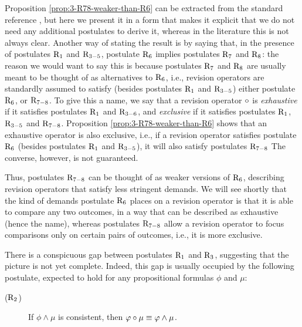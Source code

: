 Proposition \ref{prop:3-R78-weaker-than-R6} can be extracted 
from the standard reference \cite{KatsunoM92}, 
but here we present it in a form that makes it explicit 
that we do not need any additional postulates to derive it, 
whereas in the literature this is not always clear.
Another way of stating the result is by saying that, 
in the presence of postulates $\mathrm{R}_{1}$ and $\mathrm{R}_{3-5}$, postulate
$\mathrm{R}_{6}$ implies postulates $\mathrm{R}_{7}$ and $\mathrm{R}_{8}$: 
the reason we would want to say this is because 
postulates $\mathrm{R}_{7}$ and $\mathrm{R}_{8}$ are usually 
meant to be thought of as alternatives to $\mathrm{R}_{6}$,
i.e., revision operators are standardly assumed to 
satisfy (besides postulates $\mathrm{R}_{1}$ and $\mathrm{R}_{3-5}$) either postulate $\mathrm{R}_{6}$, 
or $\mathrm{R}_{7-8}$.
To give this a name, we say that 
a revision operator $\circ$ is \emph{exhaustive} if it satisfies postulates $\mathrm{R}_{1}$ and $\mathrm{R}_{3-6}$,
and \emph{exclusive} if it satisfies postulates $\mathrm{R}_{1}$, $\mathrm{R}_{3-5}$ and $\mathrm{R}_{7-8}$.
Proposition \ref{prop:3-R78-weaker-than-R6} shows that 
an exhaustive operator is also exclusive,
i.e., if a revision operator satisfies postulate $\mathrm{R}_{6}$ 
(besides postulates $\mathrm{R}_{1}$ and $\mathrm{R}_{3-5}$),
it will also satisfy postulates $\mathrm{R}_{7-8}$
The converse, however, is not guaranteed. 

Thus, postulates $\mathrm{R}_{7-8}$ can be thought of as weaker versions of $\mathrm{R}_{6}$,
describing revision operators that satisfy less stringent demands.
We will see shortly that the kind of demands postulate $\mathrm{R}_{6}$ places 
on a revision operator is that it is able 
to compare any two outcomes, in a way that can be described as exhaustive (hence the name),
whereas postulates $\mathrm{R}_{7-8}$ allow a revision operator to focus comparisons 
only on certain pairs of outcomes, i.e., it is more exclusive.

There is a conspicuous gap between postulates $\mathrm{R}_{1}$ and $\mathrm{R}_{3}$, 
suggesting that the picture is not yet complete.
Indeed, this gap is usually occupied by the following postulate,
expected to hold for any propositional formulas $\phi$ and $\mu$:

\begin{description}
	\item[($\mathrm{R}_{2}$)] If $\phi\land\mu$ is consistent, 
		then $\varphi\circ\mu\equiv\varphi\land\mu$.
\end{description}

